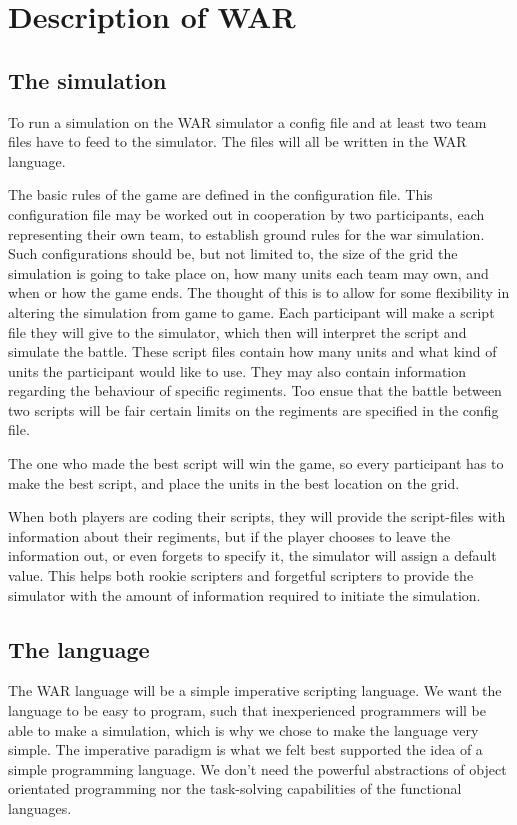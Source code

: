 
\section{ Description of WAR }

	\subsection{The simulation}
		To run a simulation on the WAR simulator a config file and at least two team files have to feed to the simulator. 
		The files will all be written in the WAR language.
		
		The basic rules of the game are defined in the configuration file. 
		This configuration file may be worked out in cooperation by two participants, each representing their own team, 
		to establish ground rules for the war simulation. Such configurations should be, but not limited to, 
		the size of the grid the simulation is going to take place on, how many units each team may own, and when or how the game ends.
		The thought of this is to allow for some flexibility in altering the simulation from game to game.
		Each participant will make a script file they will give to the simulator, 
		which then will interpret the script and simulate the battle. 
		These script files contain how many units and what kind of units the participant would like to use. 
		They may also contain information regarding the behaviour of specific regiments. 
		Too ensue that the battle between two scripts will be fair certain limits on the regiments are specified in the config file.
	
		The one who made the best script will win the game, so every participant has to make the best script, 
		and place the units in the best location on the grid.
	
		When both players are coding their scripts, they will provide the script-files with information about their regiments, 
		but if the player chooses to leave the information out, or even forgets to specify it, 
		the simulator will assign a default value. 
		This helps both rookie scripters and forgetful scripters to provide the simulator 
		with the amount of information required to initiate the simulation.

	\subsection{The language}
		The WAR language will be a simple imperative scripting language. 
		We want the language to be easy to program, such that inexperienced programmers will be able to make a simulation, which is why we chose to
		make the language very simple. The imperative paradigm is what we felt best supported the idea of a simple programming language. We don't need the
		powerful abstractions of object orientated programming nor the task-solving capabilities of the functional languages.
		
